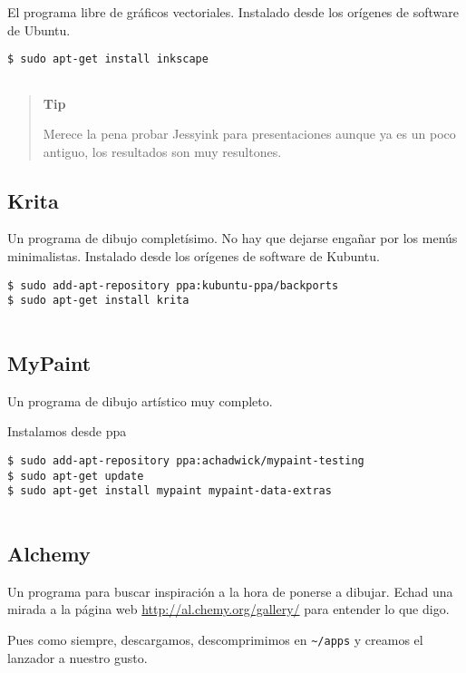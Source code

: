 El programa libre de gráficos vectoriales. Instalado desde los orígenes
de software de Ubuntu.

\begin{verbatim}
$ sudo apt-get install inkscape
      
\end{verbatim}

\begin{quote}
\textbf{Tip}

Merece la pena probar Jessyink para presentaciones aunque ya es un poco
antiguo, los resultados son muy resultones.
\end{quote}

\subsection{Krita}\label{krita}

Un programa de dibujo completísimo. No hay que dejarse engañar por los
menús minimalistas. Instalado desde los orígenes de software de Kubuntu.

\begin{verbatim}
$ sudo add-apt-repository ppa:kubuntu-ppa/backports
$ sudo apt-get install krita
      
\end{verbatim}

\subsection{MyPaint}\label{mypaint}

Un programa de dibujo artístico muy completo.

Instalamos desde ppa

\begin{verbatim}
$ sudo add-apt-repository ppa:achadwick/mypaint-testing
$ sudo apt-get update
$ sudo apt-get install mypaint mypaint-data-extras
      
\end{verbatim}

\subsection{Alchemy}\label{alchemy}

Un programa para buscar inspiración a la hora de ponerse a dibujar.
Echad una mirada a la página web \url{http://al.chemy.org/gallery/} para
entender lo que digo.

Pues como siempre, descargamos, descomprimimos en
\texttt{\textasciitilde{}/apps} y creamos el lanzador a nuestro gusto.

